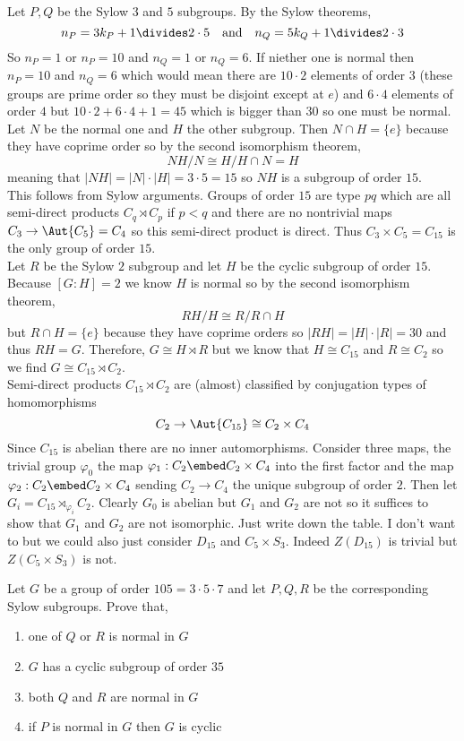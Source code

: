 \documentclass[12pt]{article}
\begin{document}
Let $P, Q$ be the Sylow $3$ and $5$ subgroups. By the Sylow theorems,
\[ n_P = 3 k_P + 1 \divides 2 \cdot 5 \quad \text{and} \quad n_Q = 5 k_Q + 1 \divides 2 \cdot 3 \]
So $n_P = 1$ or $n_P = 10$ and $n_Q = 1$ or $n_Q = 6$. If niether one is normal then $n_P = 10$ and $n_Q = 6$ which would mean there are $10 \cdot 2$ elements of order $3$ (these groups are prime order so they must be disjoint except at $e$) and $6 \cdot 4$ elements of order $4$ but $10 \cdot 2 + 6 \cdot 4 + 1 = 45$ which is bigger than $30$ so one must be normal. Let $N$ be the normal one and $H$ the other subgroup. Then $N \cap H = \{ e \}$ because they have coprime order so by the second isomorphism theorem,
\[ NH / N \cong H / H \cap N = H \]
meaning that $|NH| = |N| \cdot |H| = 3 \cdot 5 = 15$ so $NH$ is a subgroup of order $15$.
\bigskip\\
This follows from Sylow arguments. Groups of order $15$ are type $pq$ which are all semi-direct products $C_q \rtimes C_p$ if $p < q$ and there are no nontrivial maps $C_3 \to \Aut{C_5} = C_4$ so this semi-direct product is direct. Thus $C_3 \times C_5 = C_{15}$ is the only group of order $15$.
\bigskip\\
Let $R$ be the Sylow $2$ subgroup and let $H$ be the cyclic subgroup of order $15$. Because $[G : H] = 2$ we know $H$ is normal so by the second isomorphism theorem,
\[ R H / H \cong R / R \cap H \]
but $R \cap H = \{ e \}$ because they have coprime orders so $|RH| = |H| \cdot |R| = 30$ and thus $RH = G$. Therefore, $G \cong H \rtimes R$ but we know that $H \cong C_{15}$ and $R \cong C_2$ so we find $G \cong C_{15} \rtimes C_2$.
\bigskip\\
Semi-direct products $C_{15} \rtimes C_2$ are (almost) classified by conjugation types of homomorphisms
\[ C_2 \to \Aut{C_{15}} \cong C_{2} \times C_4 \]
Since $C_{15}$ is abelian there are no inner automorphisms. Consider three maps, the trivial group $\varphi_0$ the map $\varphi_1 : C_2 \embed C_2 \times C_4$ into the first factor and the map $\varphi_2 : C_2 \embed C_2 \times C_4$ sending $C_2 \to C_4$ the unique subgroup of order $2$. Then let $G_i = C_{15} \rtimes_{\varphi_i} C_2$. Clearly $G_0$ is abelian but $G_1$ and $G_2$ are not so it suffices to show that $G_1$ and $G_2$ are not isomorphic. Just write down the table. I don't want to but we could also just consider $D_{15}$ and $C_5 \times S_3$. Indeed $Z(D_{15})$ is trivial but $Z(C_5 \times S_3)$ is not. 

\begin{exercise}
Let $G$ be a group of order $105 = 3 \cdot 5 \cdot 7$ and let $P,Q,R$ be the corresponding Sylow subgroups. Prove that,
\begin{enumerate}
\item one of $Q$ or $R$ is normal in $G$
\item $G$ has a cyclic subgroup of order $35$
\item both $Q$ and $R$ are normal in $G$
\item if $P$ is normal in $G$ then $G$ is cyclic 
\end{enumerate}
\end{exercise} 
\end{document}
